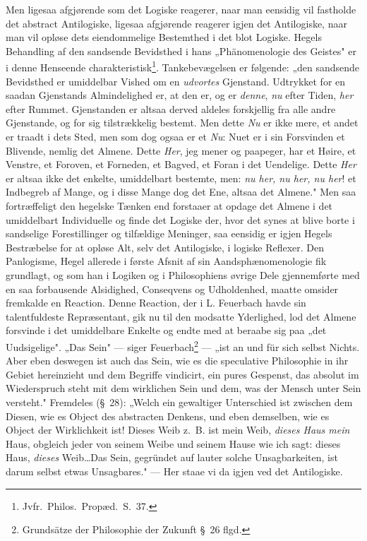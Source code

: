 \documentclass[12pt]{book}
\newcommand{\opage}[1]{\marginnote{\footnotesize\textit{[#1]}}}
\begin{document}
Men ligesaa afgjørende som det Logiske reagerer, naar man eensidig vil fastholde det abstract
Antilogiske, ligesaa afgjørende reagerer igjen det Antilogiske, naar man vil opløse dets
eiendommelige Bestemthed i det blot Logiske. Hegels Behandling af den sandsende Bevidsthed i
hans „Phänomenologie des Geistes" er i denne Henseende charakteristisk\footnote{Jvfr.\ Philos.\
Propæd.\ S.~37.}. Tankebevægelsen er følgende: „den sandsende Bevidsthed er umiddelbar Vished om
en \emph{udvortes} Gjenstand. Udtrykket for en saadan Gjenstands Almindelighed er, at den er,
og er \emph{denne}, \emph{nu} efter Tiden, \emph{her} efter Rummet. Gjenstanden er altsaa derved
aldeles forskjellig fra alle andre
\opage{159} Gjenstande, og for sig tilstrækkelig bestemt. Men dette \emph{Nu} er ikke mere, et andet er
traadt i dets Sted, men som dog ogsaa er et \emph{Nu}: Nuet er i sin Forsvinden et Blivende,
nemlig det Almene. Dette \emph{Her}, jeg mener og paapeger, har et Høire, et Venstre, et
Foroven, et Forneden, et Bagved, et Foran i det Uendelige. Dette \emph{Her} er altsaa ikke det
enkelte, umiddelbart bestemte, men: \emph{nu her, nu her, nu her}! et Indbegreb af Mange, og i
disse Mange dog det Ene, altsaa det Almene." Men saa fortræffeligt den hegelske Tænken end
forstaaer at opdage det Almene i det umiddelbart Individuelle og finde det Logiske der, hvor det
synes at blive borte i sandselige Forestillinger og tilfældige Meninger, saa eensidig er igjen
Hegels Bestræbelse for at opløse Alt, selv det Antilogiske, i logiske Reflexer. Den Panlogisme,
Hegel allerede i første Afsnit af sin Aandsphænomenologie fik grundlagt, og som han i Logiken og
i Philosophiens øvrige Dele gjennemførte med en saa forbausende Alsidighed, Conseqvens og
Udholdenhed, maatte omsider fremkalde en Reaction. Denne Reaction, der i L. Feuerbach havde sin
talentfuldeste Repræsentant, gik nu til den modsatte Yderlighed, lod det Almene forsvinde i det
umiddelbare Enkelte og endte med at beraabe sig paa „det Uudsigelige". „Das Sein" --- siger
Feuerbach\footnote{Grundsätze der Philosophie der Zukunft \S~26 flgd.} --- „ist an und für sich
selbst Nichts. Aber eben deswegen ist auch das Sein, wie es die speculative Philosophie in ihr
Gebiet hereinzieht und dem Begriffe vindicirt, ein pures Gespenst, das absolut im Wiederspruch
steht mit dem wirklichen Sein und dem, was der Mensch unter Sein versteht." Fremdeles (\S~28):
„Welch ein gewaltiger Unterschied ist zwischen dem Diesen, wie es Object des abstracten Denkens,
und eben demselben, wie es Object der Wirklichkeit ist! Dieses Weib z.\ B. ist mein Weib,
\emph{dieses Haus mein} Haus, obgleich jeder von seinem Weibe und seinem Hause wie ich sagt:
dieses Haus,
\opage{160} \emph{dieses} Weib\ldots Das Sein, gegründet auf lauter solche Unsagbarkeiten, ist darum selbst
etwas Unsagbares." --- Her staae vi da igjen ved det Antilogiske.
\end{document}
